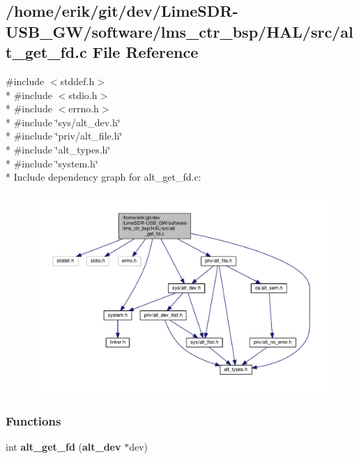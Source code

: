 \subsection{/home/erik/git/dev/\+Lime\+S\+D\+R-\/\+U\+S\+B\+\_\+\+G\+W/software/lms\+\_\+ctr\+\_\+bsp/\+H\+A\+L/src/alt\+\_\+get\+\_\+fd.c File Reference}
\label{alt__get__fd_8c}
{\ttfamily \#include $<$stddef.\+h$>$}\\*
{\ttfamily \#include $<$stdio.\+h$>$}\\*
{\ttfamily \#include $<$errno.\+h$>$}\\*
{\ttfamily \#include \char`\"{}sys/alt\+\_\+dev.\+h\char`\"{}}\\*
{\ttfamily \#include \char`\"{}priv/alt\+\_\+file.\+h\char`\"{}}\\*
{\ttfamily \#include \char`\"{}alt\+\_\+types.\+h\char`\"{}}\\*
{\ttfamily \#include \char`\"{}system.\+h\char`\"{}}\\*
Include dependency graph for alt\+\_\+get\+\_\+fd.\+c\+:
\nopagebreak
\begin{figure}[H]
\begin{center}
\leavevmode
\includegraphics[width=350pt]{d7/d5f/alt__get__fd_8c__incl}
\end{center}
\end{figure}
\subsubsection*{Functions}
\begin{DoxyCompactItemize}
\item 
int {\bf alt\+\_\+get\+\_\+fd} ({\bf alt\+\_\+dev} $\ast$dev)
\end{DoxyCompactItemize}


